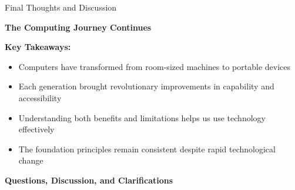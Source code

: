 \documentclass[aspectratio=169]{beamer}
\begin{document}
\begin{frame}{Final Thoughts and Discussion}
    \begin{center}
        \Large{\textbf{The Computing Journey Continues}}
    \end{center}
     
    \textbf{Key Takeaways:}
    \begin{itemize}
        \item Computers have transformed from room-sized machines to portable devices
        \item Each generation brought revolutionary improvements in capability and accessibility
        \item Understanding both benefits and limitations helps us use technology effectively
        \item The foundation principles remain consistent despite rapid technological change
    \end{itemize} 
    \begin{center}
        \textbf{Questions, Discussion, and Clarifications}
    \end{center}
\end{frame}
\end{document}
